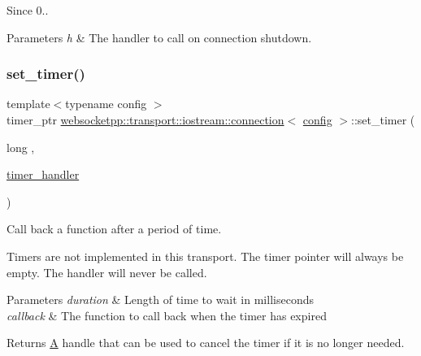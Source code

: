 \begin{DoxySince}{Since}
0..
\end{DoxySince}

\begin{DoxyParams}{Parameters}
{\em h} & The handler to call on connection shutdown. \\
\hline
\end{DoxyParams}
\mbox{\label{classwebsocketpp_1_1transport_1_1iostream_1_1connection_a7852f9c0dc64d6e51b57b4a28302a602}} 
\subsubsection{\texorpdfstring{set\+\_\+timer()}{set\_timer()}}
{\footnotesize\ttfamily template$<$typename config $>$ \\
timer\+\_\+ptr \mbox{\hyperlink{classwebsocketpp_1_1transport_1_1iostream_1_1connection}{websocketpp\+::transport\+::iostream\+::connection}}$<$ \mbox{\hyperlink{classconfig}{config}} $>$\+::set\+\_\+timer (\begin{DoxyParamCaption}\item[{long}]{,  }\item[{\mbox{\hyperlink{namespacewebsocketpp_1_1transport_a946cc56ff41139f3002149c15fd87bc9}{timer\+\_\+handler}}}]{ }\end{DoxyParamCaption})\hspace{0.3cm}{\ttfamily [inline]}}



Call back a function after a period of time. 

Timers are not implemented in this transport. The timer pointer will always be empty. The handler will never be called.


\begin{DoxyParams}{Parameters}
{\em duration} & Length of time to wait in milliseconds \\
\hline
{\em callback} & The function to call back when the timer has expired \\
\hline
\end{DoxyParams}
\begin{DoxyReturn}{Returns}
\mbox{\hyperlink{struct_a}{A}} handle that can be used to cancel the timer if it is no longer needed. 
\end{DoxyReturn}
\mbox{\label{classwebsocketpp_1_1transport_1_1iostream_1_1connection_a0f5d21e86961b0f3d75c417d5f45d4ac}} 
